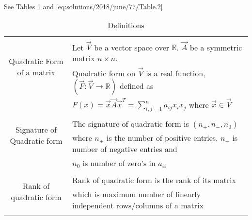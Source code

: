 See Tables     \ref{eq:solutions/2018/june/77/Table.1}
and     \ref{eq:solutions/2018/june/77/Table.2}

\onecolumn
\begin{longtable}{|c|l|}
    \hline
	\multirow{3}{*}{Quadratic Form of a matrix} 
	& \\
	& Let $\vec{V}$ be a vector space over $\mathbb{R}$. $\vec{A}$ be a symmetric matrix $n\times n$.\\& Quadratic form on $\vec{V}$ is a real function, $(\vec{F}:\vec{V}\rightarrow\mathbb{R})$ defined as 
	\\& $F(x)= \vec{x}\vec{A}\vec{x}^T= \sum_{i,j=1}^{n}a_{ij}x_ix_j$  where $\vec{x} \in \vec{V}$ \\

	\hline
	\multirow{3}{*}{Signature of Quadratic form} 
	& \\
	& The signature of quadratic form is $(n_{+},n_{-},n_{0})$ \\ & where $n_{+}$ is the number of positive entries, $n_{-}$ is number of negative entries and \\ & $n_{0}$ is number of zero's in $a_{ii}$ \\
	\hline
	\multirow{3}{*}{Rank of quadratic form} 
	& \\
	& Rank of quadratic form is the rank of its matrix \\
	& which is maximum number of linearly independent rows/columns of a matrix \\
	\hline
	\caption{Definitions}
    \label{eq:solutions/2018/june/77/Table.1}
\end{longtable}
